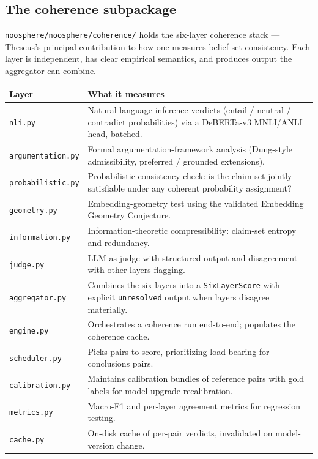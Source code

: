 \documentclass[11pt,letterpaper]{article}
\newcommand{\file}[1]{\texttt{#1}}
\newcommand{\mod}[1]{\texttt{#1}}
\begin{document}
\subsection{The coherence subpackage}

\file{noosphere/noosphere/coherence/} holds the six-layer coherence stack --- Theseus's principal contribution to how one measures belief-set consistency. Each layer is independent, has clear empirical semantics, and produces output the aggregator can combine.

\begin{longtable}{p{3.1cm} p{11.4cm}}
\toprule
\textbf{Layer} & \textbf{What it measures} \\
\midrule
\endhead
\mod{nli.py}               & Natural-language inference verdicts (entail / neutral / contradict probabilities) via a DeBERTa-v3 MNLI/ANLI head, batched. \\
\mod{argumentation.py}     & Formal argumentation-framework analysis (Dung-style admissibility, preferred / grounded extensions). \\
\mod{probabilistic.py}     & Probabilistic-consistency check: is the claim set jointly satisfiable under any coherent probability assignment? \\
\mod{geometry.py}          & Embedding-geometry test using the validated Embedding Geometry Conjecture. \\
\mod{information.py}       & Information-theoretic compressibility: claim-set entropy and redundancy. \\
\mod{judge.py}             & LLM-as-judge with structured output and disagreement-with-other-layers flagging. \\
\mod{aggregator.py}        & Combines the six layers into a \texttt{SixLayerScore} with explicit \texttt{unresolved} output when layers disagree materially. \\
\mod{engine.py}            & Orchestrates a coherence run end-to-end; populates the coherence cache. \\
\mod{scheduler.py}         & Picks pairs to score, prioritizing load-bearing-for-conclusions pairs. \\
\mod{calibration.py}       & Maintains calibration bundles of reference pairs with gold labels for model-upgrade recalibration. \\
\mod{metrics.py}           & Macro-F1 and per-layer agreement metrics for regression testing. \\
\mod{cache.py}             & On-disk cache of per-pair verdicts, invalidated on model-version change. \\
\bottomrule
\end{longtable}
\end{document}
